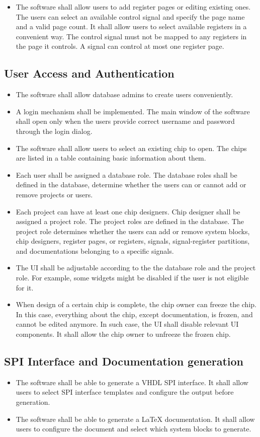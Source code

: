 \begin{itemize}
\item The software shall allow users to add register pages or editing existing ones. The users can select an available control signal and specify the page name and a valid page count. It shall allow users to select available registers in a convenient way. The control signal must not be mapped to any registers in the page it controls. A signal can control at most one register page.
\end{itemize}
\subsection{User Access and Authentication}
\begin{itemize}
\item The software shall allow database admins to create users conveniently.
\item A login mechanism shall be implemented. The main window of the software shall open only when the users provide correct username and password through the login dialog.
\item The software shall allow users to select an existing chip to open. The chips are listed in a table containing basic information about them.
\item Each user shall be assigned a database role. The database roles shall be defined in the database, determine whether the users can or cannot add or remove projects or users. 
\item Each project can have at least one chip designers. Chip designer shall be assigned a project role. The project roles are defined in the database. The project role determines whether the users can add or remove system blocks, chip designers, register pages, or registers, signals, signal-register partitions, and documentations belonging to a specific signals. 
\item The UI shall be adjustable according to the the database role and the project role. For example, some widgets might be disabled if the user is not eligible for it.
\item When design of a certain chip is complete, the chip owner can freeze the chip. In this case, everything about the chip, except documentation, is frozen, and cannot be edited anymore. In such case, the UI shall disable relevant UI components. It shall allow the chip owner to unfreeze the frozen chip.
\end{itemize}
\subsection{SPI Interface and Documentation generation}
\begin{itemize}
\item The software shall be able to generate a VHDL SPI interface. It shall allow users to select SPI interface templates and configure the output before generation.
\item The software shall be able to generate a LaTeX documentation. It shall allow users to configure the document and select which system blocks to generate.
\end{itemize}
